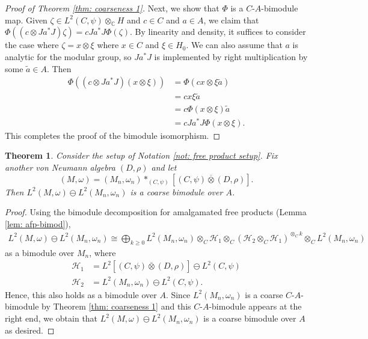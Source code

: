 \documentclass[10pt]{amsart}
\numberwithin{equation}{section}
\newtheorem{thm}{Theorem}[section]
\theoremstyle{definition}
\newcommand{\C}{\mathbb{C}}
\newcommand{\cH}{\mathcal{H}}
\newcommand{\ootimes}{\mathbin{\overline{\otimes}}}
\begin{document}
\begin{proof}[Proof of Theorem \ref{thm: coarseness 1}]
Next, we show that $\Phi$ is a $C$-$A$-bimodule map.  Given $\zeta \in L^2(C,\psi) \otimes_{\C} H$ and $c \in C$ and $a \in A$, we claim that $\Phi((c \otimes Ja^*J) \zeta) = c Ja^*J \Phi(\zeta)$.  By linearity and density, it suffices to consider the case where $\zeta = x \otimes \xi$ where $x \in C$ and $\xi \in H_0$.  We can also assume that $a$ is analytic for the modular group, so $Ja^*J$ is implemented by right multiplication by some $\tilde{a} \in A$. Then
\begin{align*}
	\Phi((c \otimes Ja^*J)(x \otimes \xi)) &= \Phi(cx \otimes \xi \tilde{a}) \\
	&= cx \xi \tilde{a} \\
	&= c \Phi(x \otimes \xi) \tilde{a} \\
	&= c Ja^*J \Phi(x \otimes \xi).
\end{align*}
This completes the proof of the bimodule isomorphism.
\end{proof}

\begin{thm} \label{thm: coarseness 2}
	Consider the setup of Notation \ref{not: free product setup}.  Fix another von Neumann algebra $(D,\rho)$ and let
	\[
	(M,\omega) = (M_n, \omega_n) *_{(C,\psi)} [(C,\psi) \ootimes (D,\rho)].
	\]
	Then $L^2(M,\omega) \ominus L^2(M_n,\omega_n)$ is a coarse bimodule over $A$.
\end{thm}

\begin{proof}
	Using the bimodule decomposition for amalgamated free products (Lemma \ref{lem: afp-bimod}),
	\begin{multline*}
		L^2(M,\omega) \ominus L^2(M_n,\omega_n) \cong \bigoplus_{k \geq 0} L^2(M_n, \omega_n) \otimes_C \cH_1 \otimes_C (\cH_2 \otimes_C \cH_1)^{\otimes_C k} \otimes_C L^2(M_n,\omega_n)
	\end{multline*}
	as a bimodule over $M_n$, where
    \begin{align*}
        \cH_1 &= L^2[(C,\psi) \ootimes (D,\rho)] \ominus L^2(C,\psi)\\
        \cH_2 &= L^2(M_n,\omega_n) \ominus L^2(C,\psi).
    \end{align*}
    Hence, this also holds as a bimodule over $A$. Since $L^2(M_n,\omega_n)$ is a coarse $C$-$A$-bimodule by Theorem \ref{thm: coarseness 1} and this $C$-$A$-bimodule appears at the right end, we obtain that $L^2(M,\omega) \ominus L^2(M_n,\omega_n)$ is a coarse bimodule over $A$ as desired.
\end{proof}
\end{document}
